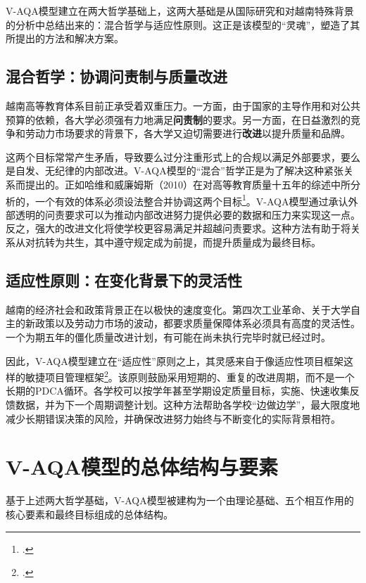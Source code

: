 V-AQA模型建立在两大哲学基础上，这两大基础是从国际研究和对越南特殊背景的分析中总结出来的：混合哲学与适应性原则。这正是该模型的“灵魂”，塑造了其所提出的方法和解决方案。

\subsection{混合哲学：协调问责制与质量改进}

越南高等教育体系目前正承受着双重压力。一方面，由于国家的主导作用和对公共预算的依赖，各大学必须强有力地满足\textbf{问责制}的要求。另一方面，在日益激烈的竞争和劳动力市场要求的背景下，各大学又迫切需要进行\textbf{改进}以提升质量和品牌。

这两个目标常常产生矛盾，导致要么过分注重形式上的合规以满足外部要求，要么是自发、无纪律的内部改进。V-AQA模型的“混合”哲学正是为了解决这种紧张关系而提出的。正如哈维和威廉姆斯（2010）在对高等教育质量十五年的综述中所分析的，一个有效的体系必须设法整合并协调这两个目标\footcite{harvey_williams_2010}。V-AQA模型通过承认外部透明的问责要求可以为推动内部改进努力提供必要的数据和压力来实现这一点。反之，强大的改进文化将使学校更容易满足并超越问责要求。这种方法有助于将关系从对抗转为共生，其中遵守规定成为前提，而提升质量成为最终目标。

\subsection{适应性原则：在变化背景下的灵活性}

越南的经济社会和政策背景正在以极快的速度变化。第四次工业革命、关于大学自主的新政策以及劳动力市场的波动，都要求质量保障体系必须具有高度的灵活性。一个为期五年的僵化质量改进计划，有可能在尚未执行完毕时就已经过时。

因此，V-AQA模型建立在“适应性”原则之上，其灵感来自于像适应性项目框架这样的敏捷项目管理框架\footcite{Wysocki2009}。该原则鼓励采用短期的、重复的改进周期，而不是一个长期的PDCA循环。各学校可以按学年甚至学期设定质量目标，实施、快速收集反馈数据，并为下一个周期调整计划。这种方法帮助各学校“边做边学”，最大限度地减少长期错误决策的风险，并确保改进努力始终与不断变化的实际背景相符。

\section{V-AQA模型的总体结构与要素}
\label{sec:cau_truc_tong_the}

基于上述两大哲学基础，V-AQA模型被建构为一个由理论基础、五个相互作用的核心要素和最终目标组成的总体结构。

